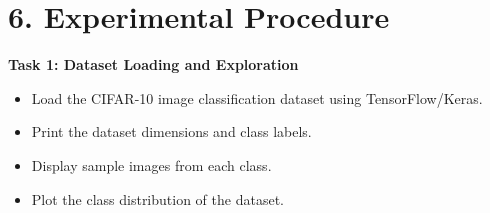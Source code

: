 \documentclass[11pt]{article}
\begin{document}











\section*{6. Experimental Procedure}

\textbf{Task 1: Dataset Loading and Exploration}

\begin{itemize}
    \item Load the CIFAR-10 image classification dataset using TensorFlow/Keras.
    \item Print the dataset dimensions and class labels.
    \item Display sample images from each class.
    \item Plot the class distribution of the dataset.
\end{itemize}
\end{document}
